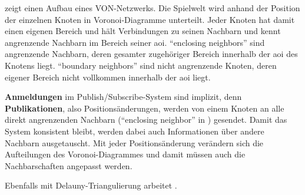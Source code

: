  zeigt einen Aufbau eines VON-Netzwerks. Die Spielwelt wird anhand der Position der einzelnen Knoten in Voronoi-Diagramme unterteilt. Jeder Knoten hat damit einen eigenen Bereich und hält Verbindungen zu seinen Nachbarn und kennt angrenzende Nachbarn im Bereich seiner \ac{aoi}. \enquote{enclosing neighbors} sind angrenzende Nachbarn, deren gesamter zugehöriger Bereich innerhalb der \ac{aoi} des Knotens liegt. \enquote{boundary neighbors} sind nicht angrenzende Knoten, deren eigener Bereich nicht vollkommen innerhalb der \ac{aoi} liegt.

\textbf{Anmeldungen} im Publish/Subscribe-System sind implizit, denn \textbf{Publikationen}, also Positionsänderungen, werden von einem Knoten an alle direkt angrenzenden Nachbarn (\enquote{enclosing neighbor} in ) gesendet. Damit das System konsistent bleibt, werden dabei auch Informationen über andere Nachbarn ausgetauscht. Mit jeder Positionsänderung verändern sich die Aufteilungen des Voronoi-Diagrammes und damit müssen auch die Nachbarschaften angepasst werden.

Ebenfalls mit Delauny-Triangulierung arbeitet \cite{Liebeherr2002Applicationlayer}.
